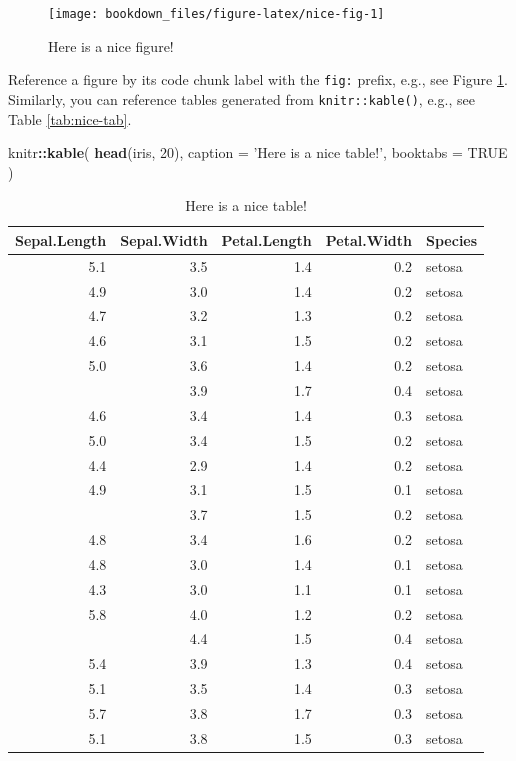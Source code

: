 \documentclass[]{krantz}
\makeatletter
\newenvironment{Shaded}{\begin{snugshade}}{\end{snugshade}}
\newcommand{\DataTypeTok}[1]{\textcolor[rgb]{0.27,0.27,0.27}{#1}}
\newcommand{\DecValTok}[1]{\textcolor[rgb]{0.06,0.06,0.06}{#1}}
\newcommand{\KeywordTok}[1]{\textcolor[rgb]{0.27,0.27,0.27}{\textbf{#1}}}
\newcommand{\NormalTok}[1]{#1}
\newcommand{\OperatorTok}[1]{\textcolor[rgb]{0.43,0.43,0.43}{\textbf{#1}}}
\newcommand{\OtherTok}[1]{\textcolor[rgb]{0.37,0.37,0.37}{#1}}
\newcommand{\StringTok}[1]{\textcolor[rgb]{0.5,0.5,0.5}{#1}}
\newenvironment{kframe}{%
\medskip{}
\setlength{\fboxsep}{.8em}
 \def\at@end@of@kframe{}%
 \ifinner\ifhmode%
  \def\at@end@of@kframe{\end{minipage}}%
  \begin{minipage}{\columnwidth}%
 \fi\fi%
 \def\FrameCommand##1{\hskip\@totalleftmargin \hskip-\fboxsep
 \colorbox{shadecolor}{##1}\hskip-\fboxsep
     \hskip-\linewidth \hskip-\@totalleftmargin \hskip\columnwidth}%
 \MakeFramed {\advance\hsize-\width
   \@totalleftmargin\z@ \linewidth\hsize
   \@setminipage}}%
 {\par\unskip\endMakeFramed%
 \at@end@of@kframe}
\renewenvironment{Shaded}{\begin{kframe}}{\end{kframe}}
\renewenvironment{Shaded}{\begin{snugshade}}{\end{snugshade}}
\renewcommand{\DataTypeTok}[1]{\textcolor[rgb]{0.13,0.29,0.53}{#1}}
\renewcommand{\DecValTok}[1]{\textcolor[rgb]{0.00,0.00,0.81}{#1}}
\renewcommand{\KeywordTok}[1]{\textcolor[rgb]{0.13,0.29,0.53}{\textbf{#1}}}
\renewcommand{\NormalTok}[1]{#1}
\renewcommand{\OperatorTok}[1]{\textcolor[rgb]{0.81,0.36,0.00}{\textbf{#1}}}
\renewcommand{\OtherTok}[1]{\textcolor[rgb]{0.56,0.35,0.01}{#1}}
\renewcommand{\StringTok}[1]{\textcolor[rgb]{0.31,0.60,0.02}{#1}}
\theoremstyle{definition}
\theoremstyle{definition}
\theoremstyle{definition}
\theoremstyle{remark}
\makeatother
\begin{document}
\begin{figure}

{\centering \texttt{[image: bookdown\_files/figure-latex/nice-fig-1]} 

}

\caption{Here is a nice figure!}\label{fig:nice-fig}
\end{figure}

Reference a figure by its code chunk label with the \texttt{fig:}
prefix, e.g., see Figure \ref{fig:nice-fig}. Similarly, you can
reference tables generated from \texttt{knitr::kable()}, e.g., see Table
\ref{tab:nice-tab}.

\begin{Shaded}
\begin{Highlighting}[]
\NormalTok{knitr}\OperatorTok{::}\KeywordTok{kable}\NormalTok{(}
  \KeywordTok{head}\NormalTok{(iris, }\DecValTok{20}\NormalTok{), }\DataTypeTok{caption =} \StringTok{'Here is a nice table!'}\NormalTok{,}
  \DataTypeTok{booktabs =} \OtherTok{TRUE}
\NormalTok{)}
\end{Highlighting}
\end{Shaded}

\begin{table}

\caption{\label{tab:unnamed-chunk-5}Here is a nice table!}
\centering
\begin{tabular}[t]{rrrrl}
\toprule
Sepal.Length & Sepal.Width & Petal.Length & Petal.Width & Species\\
\midrule
5.1 & 3.5 & 1.4 & 0.2 & setosa\\
4.9 & 3.0 & 1.4 & 0.2 & setosa\\
4.7 & 3.2 & 1.3 & 0.2 & setosa\\
4.6 & 3.1 & 1.5 & 0.2 & setosa\\
5.0 & 3.6 & 1.4 & 0.2 & setosa\\
\addlinespace
5.4 & 3.9 & 1.7 & 0.4 & setosa\\
4.6 & 3.4 & 1.4 & 0.3 & setosa\\
5.0 & 3.4 & 1.5 & 0.2 & setosa\\
4.4 & 2.9 & 1.4 & 0.2 & setosa\\
4.9 & 3.1 & 1.5 & 0.1 & setosa\\
\addlinespace
5.4 & 3.7 & 1.5 & 0.2 & setosa\\
4.8 & 3.4 & 1.6 & 0.2 & setosa\\
4.8 & 3.0 & 1.4 & 0.1 & setosa\\
4.3 & 3.0 & 1.1 & 0.1 & setosa\\
5.8 & 4.0 & 1.2 & 0.2 & setosa\\
\addlinespace
5.7 & 4.4 & 1.5 & 0.4 & setosa\\
5.4 & 3.9 & 1.3 & 0.4 & setosa\\
5.1 & 3.5 & 1.4 & 0.3 & setosa\\
5.7 & 3.8 & 1.7 & 0.3 & setosa\\
5.1 & 3.8 & 1.5 & 0.3 & setosa\\
\bottomrule
\end{tabular}
\end{table}
\end{document}
